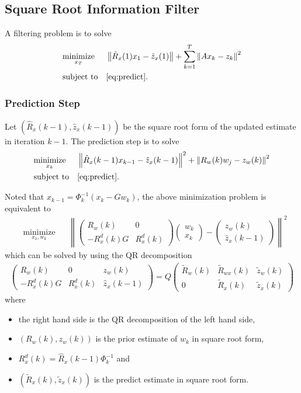\documentclass[microtype]{gtpart}     %
\theoremstyle{definition}
\newcommand{\norm}[1]{\left\lVert#1\right\rVert}
\begin{document}
\subsection{Square Root Information Filter}

A filtering problem is to solve
\begin{align*}
& \underset{x_T}{\text{minimize}} & & \norm{\tilde{R}_x(1)x_1 - \tilde{z}_x(1)} + \sum_{k=1}^{T}\norm{Ax_k - z_k}^2 \\
& \text{subject to} & & \cref{eq:predict}.
\end{align*}

\subsubsection{Prediction Step}

Let $(\hat{R}_x(k-1), \hat{z}_x(k-1))$ be the square root form of the updated estimate in iteration $k-1$.
The prediction step is to solve
\begin{align*}
	& \underset{x_k}{\text{minimize}} & &\norm{\hat{R}_x(k-1)x_{k-1} - \hat{z}_x(k-1)}^2 + \norm{R_w(k)w_j - z_w(k)}^2 \\
	& \text{subject to} & & \cref{eq:predict}.
\end{align*}

Noted that $x_{k-1} = \Phi^{-1}_k(x_k - Gw_k)$, the above minimization problem is equivalent to
\begin{align*}
	& \underset{x_k, w_k}{\text{minimize}} & &\norm{
		\begin{pmatrix}
		R_w(k) &0 \\
		-R^d_x(k)G &R^d_x(k)
		\end{pmatrix}
		\begin{pmatrix}
		w_k \\ x_k
		\end{pmatrix} - \begin{pmatrix}
		z_w(k) \\ \hat{z}_x(k-1)
		\end{pmatrix}}^2
\end{align*}
which can be solved by using the QR decomposition
\begin{align*}
	\begin{pmatrix}
		R_w(k) &0 &z_w(k) \\ 
		-R^d_x(k)G &R^d_x(k) &\hat{z}_x(k-1)
	\end{pmatrix} = Q
	\begin{pmatrix}
		\tilde{R}_w(k) &\tilde{R}_{wx}(k) &\tilde{z}_w(k) \\ 0 &\tilde{R}_x(k) &\tilde{z}_x(k)
	\end{pmatrix}
\end{align*}
where
\begin{itemize}
	\item the right hand side is the QR decomposition of the left hand side,
	\item $(R_w(k), z_w(k))$ is the prior estimate of $w_k$ in square root form,
	\item $R^d_x(k)=\hat{R}_x(k-1)\Phi^{-1}_k$ and
	\item $(\tilde{R}_x(k), \tilde{z}_x(k))$ is the predict estimate in square root form.
\end{itemize}
\end{document}
